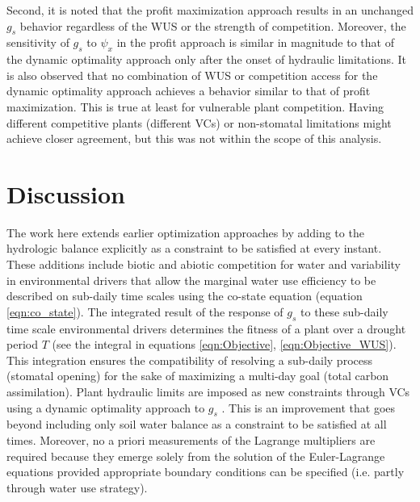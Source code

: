 \documentclass[utf8]{frontiersSCNS} %
\begin{document}
Second, it is noted that the profit maximization approach results in an unchanged $g_s$ behavior regardless of the WUS or the strength of competition. Moreover, the sensitivity of $g_s$ to $\psi_x$ in the profit approach is similar in magnitude to that of the dynamic optimality approach only after the onset of hydraulic limitations. It is also observed that no combination of WUS or competition access for the dynamic optimality approach achieves a behavior similar to that of profit maximization. This is true at least for vulnerable plant competition. Having different competitive plants (different VCs) or non-stomatal limitations might achieve closer agreement, but this was not within the scope of this analysis. 

\section{Discussion}

The work here extends earlier optimization approaches by adding to the hydrologic balance explicitly as a constraint to be satisfied at every instant. These additions include biotic and abiotic competition for water and variability in environmental drivers that allow the marginal water use efficiency to be described on sub-daily time scales using the co-state equation (equation \ref{eqn:co_state}). The integrated result of the response of $g_s$ to these sub-daily time scale environmental drivers determines the fitness of a plant over a drought period $T$ (see the integral in equations \ref{eqn:Objective}, \ref{eqn:Objective_WUS}). This integration ensures the compatibility of resolving a sub-daily process (stomatal opening) for the sake of maximizing a multi-day goal (total carbon assimilation).  Plant hydraulic limits are imposed as new constraints through VCs using a dynamic optimality approach to $g_s$ \citep{manzoni_optimization_2013}. This is an improvement that goes beyond including only soil water balance as a constraint to be satisfied at all times. Moreover, no a priori measurements of the Lagrange multipliers are required because they emerge solely from the solution of the Euler-Lagrange equations \citep{witelski_variational_2015} provided appropriate boundary conditions can be specified (i.e. partly through water use strategy).
\end{document}
